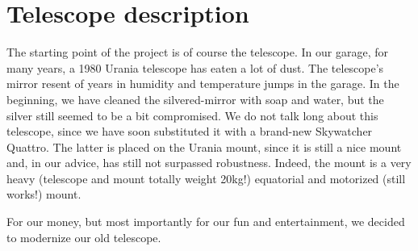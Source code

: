 

\section{Telescope description}
The starting point of the project is of course the telescope.
In our garage, for many years, a 1980 Urania telescope has eaten a lot of dust.
The telescope's mirror resent of years in humidity and temperature jumps in the garage.
In the beginning, we have cleaned the silvered-mirror with soap and water, but the silver still seemed to be a bit compromised.
We do not talk long about this telescope, since we have soon substituted it with a brand-new Skywatcher Quattro.
The latter is placed on the Urania mount, since it is still a nice mount and, in our advice, has still not surpassed robustness.
Indeed, the mount is a very heavy (telescope and mount totally weight 20kg!) equatorial and motorized (still works!) mount.

For our money, but most importantly for our fun and entertainment, we decided to modernize our old telescope.

